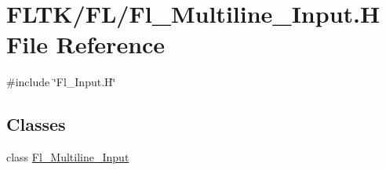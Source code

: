 \hypertarget{_fl___multiline___input_8_h}{}\section{F\+L\+T\+K/\+F\+L/\+Fl\+\_\+\+Multiline\+\_\+\+Input.H File Reference}
\label{_fl___multiline___input_8_h}
{\ttfamily \#include \char`\"{}Fl\+\_\+\+Input.\+H\char`\"{}}\newline
\subsection*{Classes}
\begin{DoxyCompactItemize}
\item 
class \hyperlink{class_fl___multiline___input}{Fl\+\_\+\+Multiline\+\_\+\+Input}
\end{DoxyCompactItemize}
